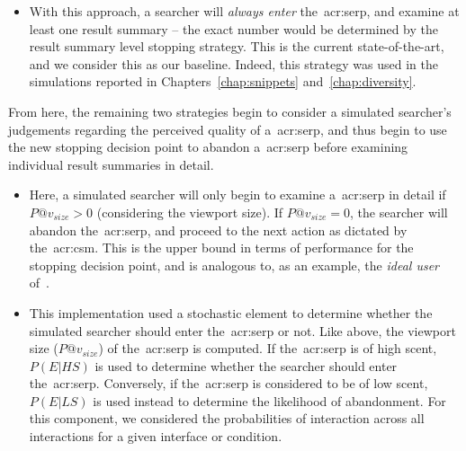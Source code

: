 \begin{itemize}
    \item{ With this approach, a searcher will \emph{always enter} the~\gls{acr:serp}, and examine at least one result summary -- the exact number would be determined by the result summary level stopping strategy. This is the current state-of-the-art, and we consider this as our baseline. Indeed, this strategy was used in the simulations reported in Chapters~\ref{chap:snippets} and~\ref{chap:diversity}.}
\end{itemize}

From here, the remaining two strategies begin to consider a simulated searcher's judgements regarding the perceived quality of a~\gls{acr:serp}, and thus begin to use the new stopping decision point to abandon a~\gls{acr:serp} before examining individual result summaries in detail.

\begin{itemize}
    \item{ Here, a simulated searcher will only begin to examine a~\gls{acr:serp} in detail if $P@v_{size} > 0$ (considering the viewport size). If $P@v_{size} = 0$, the searcher will abandon the~\gls{acr:serp}, and proceed to the next action as dictated by the~\gls{acr:csm}. This is the upper bound in terms of performance for the stopping decision point, and is analogous to, as an example, the \emph{ideal user} of~\cite{hagen2016simulating_users}.}
    \item{ This implementation used a stochastic element to determine whether the simulated searcher should enter the~\gls{acr:serp} or not. Like above, the viewport size ($P@v_{size}$) of the~\gls{acr:serp} is computed. If the~\gls{acr:serp} is of high scent, $P(E|HS)$ is used to determine whether the searcher should enter the~\gls{acr:serp}. Conversely, if the~\gls{acr:serp} is considered to be of low scent, $P(E|LS)$ is used instead to determine the likelihood of abandonment. For this component, we considered the probabilities of interaction across all interactions for a given interface or condition.}
    
%
\end{itemize}

